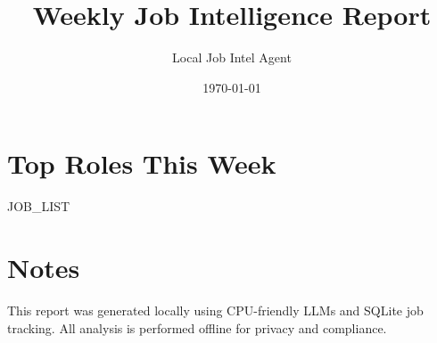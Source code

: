 \documentclass{article}
\title{Weekly Job Intelligence Report}
\author{Local Job Intel Agent}
\date{\today}
\begin{document}
\maketitle

\section*{Top Roles This Week}
\begin{itemize}
{{JOB_LIST}}
\end{itemize}

\section*{Notes}
This report was generated locally using CPU-friendly LLMs and SQLite job tracking.
All analysis is performed offline for privacy and compliance.
\end{document}
